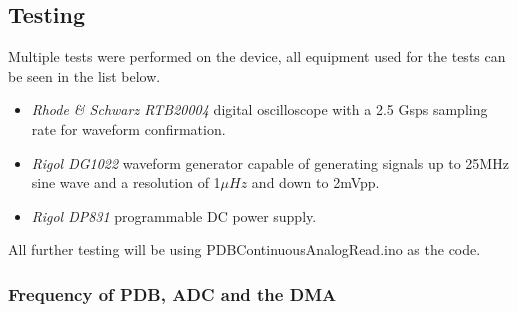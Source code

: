 \vspace{6cm}

\subsection{Testing}









Multiple tests were performed on the device, all equipment used for the tests can be seen in the list below.
\begin{itemize}
    \item \textit{Rhode \& Schwarz RTB20004} digital oscilloscope with a 2.5 Gsps sampling rate for waveform confirmation.
    \item \textit{Rigol DG1022} waveform generator capable of generating signals up to 25MHz sine wave and a resolution of 1$\mu Hz$ and down to 2mVpp.
    \item \textit{Rigol DP831} programmable DC power supply.
\end{itemize}
All further testing will be using PDBContinuousAnalogRead.ino as the code.


\subsubsection{Frequency of PDB, ADC and the DMA}

